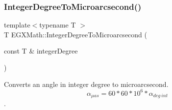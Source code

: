 \mbox{\label{group___e_g_x_math-_angle_conversions-_integer_degree_ga69179d6082764595c7014805e1f6b31e}} 
\subsubsection{\texorpdfstring{Integer\+Degree\+To\+Microarcsecond()}{IntegerDegreeToMicroarcsecond()}}
{\footnotesize\ttfamily template$<$typename T $>$ \\
T E\+G\+X\+Math\+::\+Integer\+Degree\+To\+Microarcsecond (\begin{DoxyParamCaption}\item[{const T \&}]{integer\+Degree }\end{DoxyParamCaption})}



Converts an angle in integer degree to microarcsecond. \[\alpha_{\mu as}=60 * 60 * 10^6 * \alpha_{deg\ int}\]. 

